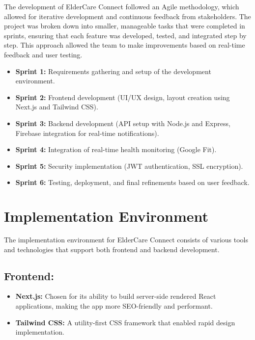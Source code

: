 \documentclass[a4paper, 12pt]{article}
\begin{document}
The development of ElderCare Connect followed an Agile methodology, which allowed for iterative development and continuous feedback from stakeholders. The project was broken down into smaller, manageable tasks that were completed in sprints, ensuring that each feature was developed, tested, and integrated step by step. This approach allowed the team to make improvements based on real-time feedback and user testing.

\begin{itemize}
    \item \textbf{Sprint 1:} Requirements gathering and setup of the development environment.
    \item \textbf{Sprint 2:} Frontend development (UI/UX design, layout creation using Next.js and Tailwind CSS).
    \item \textbf{Sprint 3:} Backend development (API setup with Node.js and Express, Firebase integration for real-time notifications).
    \item \textbf{Sprint 4:} Integration of real-time health monitoring (Google Fit).
    \item \textbf{Sprint 5:} Security implementation (JWT authentication, SSL encryption).
    \item \textbf{Sprint 6:} Testing, deployment, and final refinements based on user feedback.
\end{itemize}

\section{\textbf{\LARGE Implementation Environment}}

The implementation environment for ElderCare Connect consists of various tools and technologies that support both frontend and backend development.

\subsection*{Frontend:}
\begin{itemize}
    \item \textbf{Next.js:} Chosen for its ability to build server-side rendered React applications, making the app more SEO-friendly and performant.
    \item \textbf{Tailwind CSS:} A utility-first CSS framework that enabled rapid design implementation.
\end{itemize}
\end{document}
